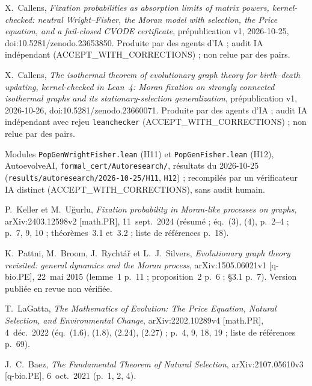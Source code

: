  X.~Callens, \emph{Fixation probabilities as absorption limits of matrix powers, kernel-checked:
neutral Wright--Fisher, the Moran model with selection, the Price equation, and a fail-closed CVODE certificate},
prépublication v1, 2026-10-25, doi:10.5281/zenodo.23653850. Produite par des agents d'IA ; audit IA indépendant
(ACCEPT\_WITH\_CORRECTIONS) ; non relue par des pairs.

 X.~Callens, \emph{The isothermal theorem of evolutionary graph theory for birth--death updating,
kernel-checked in Lean~4: Moran fixation on strongly connected isothermal graphs and its stationary-selection
generalization}, prépublication v1, 2026-10-26, doi:10.5281/zenodo.23660071. Produite par des agents d'IA ; audit
IA indépendant avec rejeu \texttt{leanchecker} (ACCEPT\_WITH\_CORRECTIONS) ; non relue par des pairs.

 Modules \texttt{PopGenWrightFisher.lean} (H11) et \texttt{PopGenFisher.lean} (H12),
AutoevolveAI, \texttt{formal\_cert/Autoresearch/}, résultats du 2026-10-25
(\texttt{results/autoresearch/2026-10-25/H11}, \texttt{H12}) ; recompilés par un vérificateur IA distinct
(ACCEPT\_WITH\_CORRECTIONS), sans audit humain.

 P.~Keller et M.~Uğurlu, \emph{Fixation probability in Moran-like processes on graphs},
arXiv:2403.12598v2 [math.PR], 11~sept.\ 2024 (résumé ; éq.~(3), (4), p.~2--4 ; p.~7, 9, 10 ; théorèmes~3.1
et~3.2 ; liste de références p.~18).

 K.~Pattni, M.~Broom, J.~Rychtář et L.~J.~Silvers, \emph{Evolutionary graph theory revisited:
general dynamics and the Moran process}, arXiv:1505.06021v1 [q-bio.PE], 22~mai 2015 (lemme~1 p.~11 ;
proposition~2 p.~6 ; §3.1 p.~7). Version publiée en revue non vérifiée.

 T.~LaGatta, \emph{The Mathematics of Evolution: The Price Equation, Natural Selection, and
Environmental Change}, arXiv:2202.10289v4 [math.PR], 4~déc.\ 2022 (éq.~(1.6), (1.8), (2.24), (2.27) ;
p.~4, 9, 18, 19 ; liste de références p.~69).

 J.~C.~Baez, \emph{The Fundamental Theorem of Natural Selection}, arXiv:2107.05610v3
[q-bio.PE], 6~oct.\ 2021 (p.~1, 2, 4).

